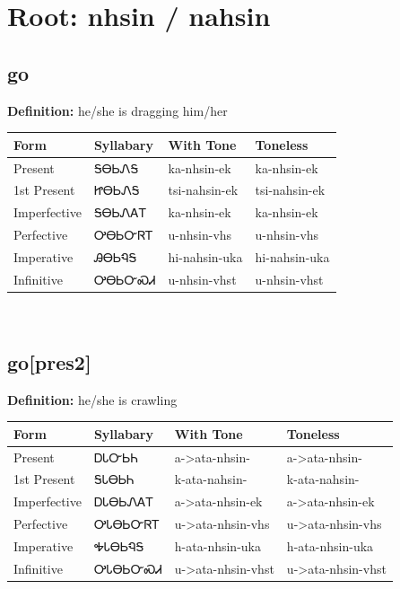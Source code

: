 \documentclass{article}%
\begin{document}
%
\normalsize%
\section*{Root: nhsin / nahsin}%
\subsection*{go}%
\textbf{Definition: }%
he/she is dragging him/her%
\\[0.5em]%
\begin{tabular}{|l|l|l|l|}%
\hline%
\textbf{Form}&\textbf{Syllabary}&\textbf{With Tone}&\textbf{Toneless}\\%
\hline%
Present&ᎦᎾᏏᏁᎦ&ka{-}nhsin{-}ek&ka{-}nhsin{-}ek\\%
1st Present&ᏥᎾᏏᏁᎦ&tsi{-}nahsin{-}ek&tsi{-}nahsin{-}ek\\%
Imperfective&ᎦᎾᏏᏁᎪᎢ&ka{-}nhsin{-}ek&ka{-}nhsin{-}ek\\%
Perfective&ᎤᎾᏏᏅᏒᎢ&u{-}nhsin{-}vhs&u{-}nhsin{-}vhs\\%
Imperative&ᎯᎾᏏᏄᎦ&hi{-}nahsin{-}uka&hi{-}nahsin{-}uka\\%
Infinitive&ᎤᎾᏏᏅᏍᏗ&u{-}nhsin{-}vhst&u{-}nhsin{-}vhst\\%
\hline%
\end{tabular}%
\\[1em]%
\subsection*{go[pres2]}%
\textbf{Definition: }%
he/she is crawling%
\\[0.5em]%
\begin{tabular}{|l|l|l|l|}%
\hline%
\textbf{Form}&\textbf{Syllabary}&\textbf{With Tone}&\textbf{Toneless}\\%
\hline%
Present&ᎠᏓᏅᏏᏂ&a{-}>ata{-}nhsin{-}&a{-}>ata{-}nhsin{-}\\%
1st Present&ᎦᏓᎾᏏᏂ&k{-}ata{-}nahsin{-}&k{-}ata{-}nahsin{-}\\%
Imperfective&ᎠᏓᎾᏏᏁᎪᎢ&a{-}>ata{-}nhsin{-}ek&a{-}>ata{-}nhsin{-}ek\\%
Perfective&ᎤᏓᎾᏏᏅᏒᎢ&u{-}>ata{-}nhsin{-}vhs&u{-}>ata{-}nhsin{-}vhs\\%
Imperative&ᎭᏓᎾᏏᏄᎦ&h{-}ata{-}nhsin{-}uka&h{-}ata{-}nhsin{-}uka\\%
Infinitive&ᎤᏓᎾᏏᏅᏍᏗ&u{-}>ata{-}nhsin{-}vhst&u{-}>ata{-}nhsin{-}vhst\\%
\hline%
\end{tabular}%
\\[1em]%
\end{document}
